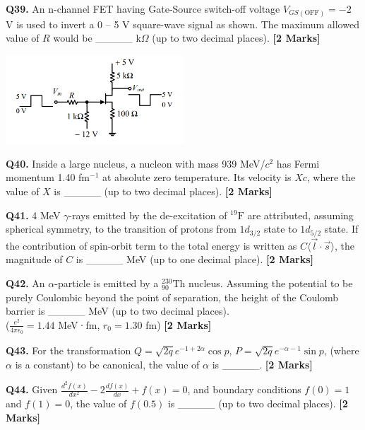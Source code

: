 \documentclass[11pt]{article}
\newcommand{\questionb}[2]{
    \noindent\textbf{Q#2.} #1 \hfill \textbf{[2 Marks]}
}
\begin{document}
\questionb{An n-channel FET having Gate-Source switch-off voltage \(V_{GS(\text{OFF})} = -2\) V is used to invert a 0 – 5 V square-wave signal as shown. The maximum allowed value of \(R\) would be \_\_\_\_\_ k\(\Omega\) (up to two decimal places).}{39}
\begin{center}
\includegraphics[width=0.5\textwidth]{figures/39.png}
\end{center}
\vspace{0.5cm}

\questionb{Inside a large nucleus, a nucleon with mass 939 MeV/\(c^2\) has Fermi momentum 1.40 fm\(^{-1}\) at absolute zero temperature. Its velocity is \(Xc\), where the value of \(X\) is \_\_\_\_\_ (up to two decimal places).}{40}
\vspace{0.5cm}

\questionb{4 MeV \(\gamma\)-rays emitted by the de-excitation of \({}^{19}\text{F}\) are attributed, assuming spherical symmetry, to the transition of protons from \(1d_{3/2}\) state to \(1d_{5/2}\) state. If the contribution of spin-orbit term to the total energy is written as \(C \langle \vec{l} \cdot \vec{s} \rangle\), the magnitude of \(C\) is \_\_\_\_\_ MeV (up to one decimal place).}{41}
\vspace{0.5cm}

\questionb{An \(\alpha\)-particle is emitted by a \({}^{230}_{90}\text{Th}\) nucleus. Assuming the potential to be purely Coulombic beyond the point of separation, the height of the Coulomb barrier is \_\_\_\_\_ MeV (up to two decimal places).\\
(\(\frac{e^2}{4\pi\epsilon_0} = 1.44\) MeV·fm, \(r_0 = 1.30\) fm)}{42}
\vspace{0.5cm}

\questionb{For the transformation \(Q = \sqrt{2q} e^{-1 + 2\alpha} \cos p\), \(P = \sqrt{2q} e^{-\alpha - 1} \sin p\), (where \(\alpha\) is a constant) to be canonical, the value of \(\alpha\) is \_\_\_\_\_.}{43}
\vspace{0.5cm}

\questionb{Given \(\frac{d^2f(x)}{dx^2} - 2\frac{df(x)}{dx} + f(x) = 0\), and boundary conditions \(f(0) = 1\) and \(f(1) = 0\), the value of \(f(0.5)\) is \_\_\_\_\_ (up to two decimal places).}{44}
\vspace{0.5cm}
\end{document}
